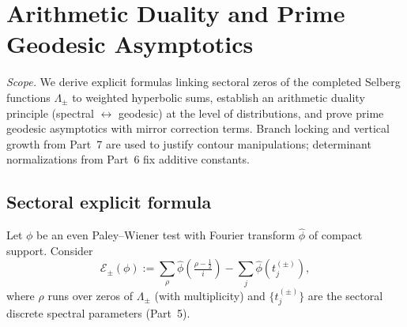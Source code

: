 
\section{Arithmetic Duality and Prime Geodesic Asymptotics}
\label{sec:ch6-part8-arith-duality} \relax \hspace{0pt}
\FlowBreaker
\noindent\emph{Scope.} We derive explicit formulas linking sectoral zeros of the completed Selberg functions $\Lambda_\pm$ to weighted hyperbolic sums, establish an arithmetic duality principle (spectral $\leftrightarrow$ geodesic) at the level of distributions, and prove prime geodesic asymptotics with mirror correction terms. Branch locking and vertical growth from Part~7 are used to justify contour manipulations; determinant normalizations from Part~6 fix additive constants.  %


\subsection{Sectoral explicit formula}
\label{subsec:ch6-part8-explicit} \relax \hspace{0pt}
Let $\phi$ be an even Paley–Wiener test with Fourier transform $\widehat\phi$ of compact support. Consider
\[
\mathcal E_\pm(\phi)
:= \sum_\rho \widehat\phi\!\left(\tfrac{\rho-\tfrac12}{i}\right) - \sum_{j} \widehat\phi(t_j^{(\pm)}),
\]
where $\rho$ runs over zeros of $\Lambda_\pm$ (with multiplicity) and $\{t_j^{(\pm)}\}$ are the sectoral discrete spectral parameters (Part~5).  %

